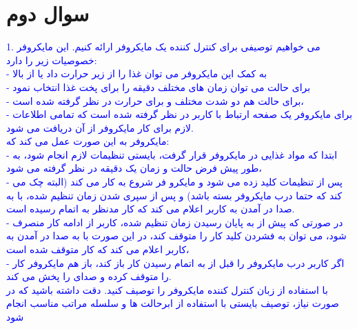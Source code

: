 \documentclass[12pt,a4paper]{article}							   %
\begin{document}
\section{سوال دوم }
	\begin{RTL}
			\textcolor{blue}{
1.	می خواهیم توصیفی برای کنترل کننده یک مایکروفر ارائه کنیم. این مایکروفر خصوصیات زیر را دارد:\\
-	به کمک این مایکروفر می توان غذا را از زیر حرارت داد
یا از بالا
 \\
-	برای حالت
 می توان زمان های مختلف
دقیقه را برای پخت غذا انتخاب نمود\\
-	برای حالت 
هم دو شدت مختلف
و
 برای حرارت در نظر گرفته شده است،\\
-	برای مایکروفر یک صفحه ارتباط با کاربر در نظر گرفته شده است که تمامی اطلاعات لازم برای کار مایکروفر از آن دریافت می شود. \\
مایکروفر به این صورت عمل می کند که: \\
-	ابتدا که مواد غذایی در مایکروفر قرار گرفت، بایستی تنظیمات لازم انجام شود، به طور پیش فرض حالت
 و زمان یک دقیقه در نظر گرفته می شود، \\
-	پس از تنظیمات کلید
 زده می شود و مایکرو فر شروع به کار می کند (البته چک می کند که حتما درب مایکروفر بسته باشد) و پس از سپری شدن زمان تنظیم شده، با به صدا در آمدن
 به کاربر اعلام می کند که کار مدنظر به اتمام رسیده است. \\
-	در صورتی که پیش از به پایان رسیدن زمان تنظیم شده، کاربر از ادامه کار منصرف شود، می توان به فشردن کلید
 کار را متوقف کند، در این صورت با به صدا در آمدن
 به کاربر اعلام می کند که کار متوقف شده است، \\
-	اگر کاربر درب مایکروفر را قبل از به اتمام رسیدن کار باز کند، باز هم مایکروفر کار را متوقف کرده و صدای
 را پخش می کند. \\
با استفاده از زبان
 کنترل کننده مایکروفر را توصیف کنید. دقت داشته باشید که در صورت نیاز، توصیف بایستی با استفاده از ابرحالت ها و سلسله مراتب مناسب انجام شود\\
  \\
			}

	\end{RTL}
\end{document}
